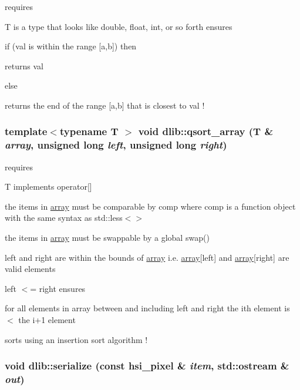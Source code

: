 \label{namespacedlib_a36bcf970b14e81d1c300283a52d64142}
requires
\begin{DoxyItemize}
\item T is a type that looks like double, float, int, or so forth ensures
\item if (val is within the range \mbox{[}a,b\mbox{]}) then
\begin{DoxyItemize}
\item returns val
\end{DoxyItemize}
\item else
\begin{DoxyItemize}
\item returns the end of the range \mbox{[}a,b\mbox{]} that is closest to val ! 
\end{DoxyItemize}
\end{DoxyItemize}\hypertarget{namespacedlib_a603b4c76cedf8bff5975b76817f27eaa}{
\subsubsection[{qsort\_\-array}]{\setlength{\rightskip}{0pt plus 5cm}template$<$typename T $>$ void dlib::qsort\_\-array (T \& {\em array}, \/  unsigned long {\em left}, \/  unsigned long {\em right})}}
\label{namespacedlib_a603b4c76cedf8bff5975b76817f27eaa}
requires
\begin{DoxyItemize}
\item T implements operator\mbox{[}\mbox{]}
\item the items in \hyperlink{classdlib_1_1array}{array} must be comparable by comp where comp is a function object with the same syntax as std::less$<$$>$
\item the items in \hyperlink{classdlib_1_1array}{array} must be swappable by a global swap()
\item left and right are within the bounds of \hyperlink{classdlib_1_1array}{array} i.e. \hyperlink{classdlib_1_1array}{array}\mbox{[}left\mbox{]} and \hyperlink{classdlib_1_1array}{array}\mbox{[}right\mbox{]} are valid elements
\item left $<$= right ensures
\item for all elements in array between and including left and right the ith element is $<$ the i+1 element
\item sorts using an insertion sort algorithm ! 
\end{DoxyItemize}\hypertarget{namespacedlib_add718e65e3023a2abd8eb04200e81b52}{
\subsubsection[{serialize}]{\setlength{\rightskip}{0pt plus 5cm}void dlib::serialize (const hsi\_\-pixel \& {\em item}, \/  std::ostream \& {\em out})}}
